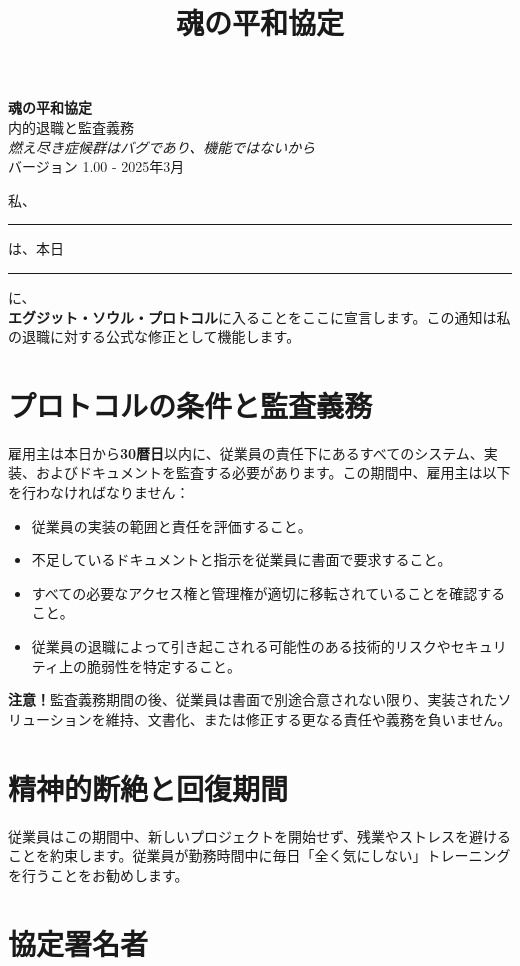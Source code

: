 \documentclass[a4paper,11pt]{article}
\title{魂の平和協定}
\date{}
\begin{document}
\pagestyle{empty}

\begin{center}
    {\LARGE \textbf{魂の平和協定}}\\[1em]
    {\large 内的退職と監査義務}\\[0.5em]
    \textit{燃え尽き症候群はバグであり、機能ではないから}\\[0.5em]
    {\small バージョン 1.00 - 2025年3月}
\end{center}

\vspace{2em}

私、\rule{7cm}{0.2pt}は、本日\rule{4cm}{0.2pt}に、\\
\textbf{エグジット・ソウル・プロトコル}に入ることをここに宣言します。この通知は私の退職に対する公式な修正として機能します。

\section*{プロトコルの条件と監査義務}

雇用主は本日から\textbf{30暦日}以内に、従業員の責任下にあるすべてのシステム、実装、およびドキュメントを監査する必要があります。この期間中、雇用主は以下を行わなければなりません：

\begin{itemize}
    \item 従業員の実装の範囲と責任を評価すること。
    \item 不足しているドキュメントと指示を従業員に書面で要求すること。
    \item すべての必要なアクセス権と管理権が適切に移転されていることを確認すること。
    \item 従業員の退職によって引き起こされる可能性のある技術的リスクやセキュリティ上の脆弱性を特定すること。
\end{itemize}

\textbf{注意！}監査義務期間の後、従業員は書面で別途合意されない限り、実装されたソリューションを維持、文書化、または修正する更なる責任や義務を負いません。

\section*{精神的断絶と回復期間}

従業員はこの期間中、新しいプロジェクトを開始せず、残業やストレスを避けることを約束します。従業員が勤務時間中に毎日「全く気にしない」トレーニングを行うことをお勧めします。

\section*{協定署名者}
\end{document}
